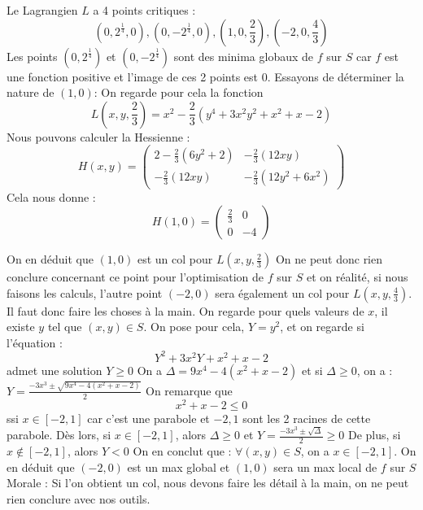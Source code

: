 \begin{exemple}
    Le Lagrangien $L$ a 4 points critiques :
    $$(0,2^{\frac{1}{4}},0),(0,-2^{\frac{1}{4}},0),(1,0,\frac{2}{3}),(-2,0,\frac{4}{3})$$
    Les points $(0,2^{\frac{1}{4}}) $ et $(0,-2^{\frac{1}{4}})$ sont des minima globaux de $f$ sur $S$ car $f$ est une fonction positive et l'image de ces 2 points est $0$.
    Essayons de déterminer la nature de $(1,0)$:
    On regarde pour cela la fonction 
    $$L(x,y,\frac{2}{3}) = x^2 -\frac{2}{3}(y^4+3x^2y^2+x^2+x-2)$$
    Nous pouvons calculer la Hessienne :
    $$H(x,y) = \begin{pmatrix}
        2-\frac{2}{3}(6y^2+2) & -\frac{2}{3}(12xy)\\
        -\frac{2}{3}(12xy)& -\frac{2}{3}(12y^2+6x^2)
    \end{pmatrix}$$
    Cela nous donne :
    $$H(1,0) = \begin{pmatrix}
        \frac{2}{3} & 0\\
        0 & -4
    \end{pmatrix}$$
\end{exemple}
\begin{exemple}
    On en déduit que $(1,0)$ est un col pour $L(x,y,\frac{2}{3})$
    On ne peut donc rien conclure concernant ce point pour l'optimisation de $f$ sur $S$ et on réalité, si nous faisons les calculs, l'autre point $(-2,0)$ sera également un col pour $L(x,y,\frac{4}{3})$.
    Il faut donc faire les choses à la main.
    On regarde pour quels valeurs de $x$, il existe $y$ tel que $(x,y) \in S$.
    On pose pour cela, $Y = y^2$, et on regarde si l'équation :
    $$Y^2+3x^2Y+x^2 + x -2$$ admet une solution $Y\ge 0$
    On a $\Delta = 9x^4 - 4(x^2+x-2)$ et si $\Delta \ge 0$, on a :
    $Y = \frac{-3x^3 \pm \sqrt{9x^4-4(x^2+x-2)}}{2}$
    On remarque que
    $$x^2+x-2 \le 0$$ ssi $x\in [-2,1]$ car c'est une parabole et $-2,1$ sont les 2 racines de cette parabole.
    Dès lors, si $x\in [-2,1]$, alors $\Delta \ge 0$ et $Y = \frac{-3x^3 \pm \sqrt{\Delta}}{2} \ge 0$
    De plus, si $x \notin[-2,1] $, alors $Y < 0$
    On en conclut que :
    $\forall (x,y) \in S$, on a $x\in [-2,1]$.
    On en déduit que $(-2,0)$ est un max global et $(1,0)$ sera un max local de $f$ sur $S$
    Morale : Si l'on obtient un col, nous devons faire les détail à la main, on ne peut rien conclure avec nos outils.
\end{exemple}